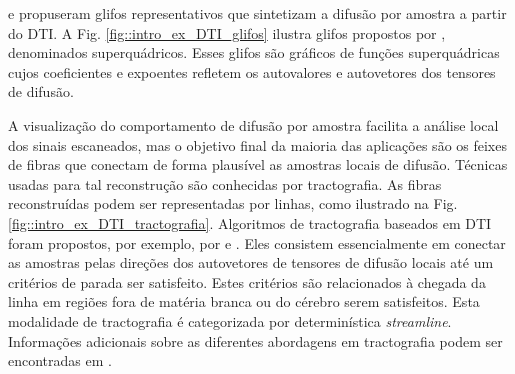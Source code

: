 \documentclass[
    12pt,                %
    oneside,            %
    a4paper,            %
    english,            %
    french,                %
    spanish,            %
    brazil                %
    ]{abntex2}
\begin{document}

 e  propuseram glifos representativos que sintetizam a difusão por amostra a partir do DTI. A Fig. \ref{fig::intro_ex_DTI_glifos} ilustra glifos propostos por , denominados superquádricos. Esses glifos são gráficos de funções superquádricas cujos coeficientes e expoentes refletem os autovalores e autovetores dos tensores de difusão.

A visualização do comportamento de difusão por amostra facilita a análise local dos sinais escaneados, mas o objetivo final da maioria das aplicações são os feixes de fibras que conectam de forma plausível as amostras locais de difusão. Técnicas usadas para tal reconstrução são conhecidas por tractografia. As fibras reconstruídas podem ser representadas por linhas, como ilustrado na Fig. \ref{fig::intro_ex_DTI_tractografia}. Algoritmos de tractografia baseados em DTI foram propostos, por exemplo, por  e . Eles consistem essencialmente em conectar as amostras pelas direções dos autovetores de tensores de difusão locais até um critérios de parada ser satisfeito. Estes critérios são relacionados à chegada da linha em regiões fora de matéria branca ou do cérebro serem satisfeitos. Esta modalidade de tractografia é categorizada por determinística \textit{streamline}. Informações adicionais sobre as diferentes abordagens em tractografia podem ser encontradas em \cite{tournier2011, DTI_Handbook}.
\end{document}
